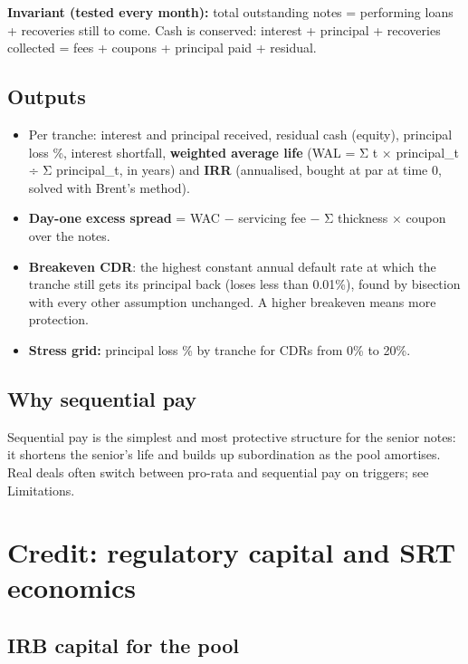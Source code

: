 \documentclass[10pt,a4paper]{article}
\providecommand{\tightlist}{\setlength{\itemsep}{1pt}\setlength{\parskip}{0pt}}
\numberwithin{equation}{section}
\begin{document}
\textbf{Invariant (tested every month):} total outstanding notes = performing loans + recoveries still to come. Cash is conserved: interest + principal + recoveries collected = fees + coupons + principal paid + residual.

\subsection{Outputs}\label{outputs}

\begin{itemize}
\tightlist
\item
  Per tranche: interest and principal received, residual cash (equity), principal loss \%, interest shortfall, \textbf{weighted average life} (WAL = Σ t × principal\_t ÷ Σ principal\_t, in years) and \textbf{IRR} (annualised, bought at par at time 0, solved with Brent's method).
\item
  \textbf{Day-one excess spread} = WAC − servicing fee − Σ thickness × coupon over the notes.
\item
  \textbf{Breakeven CDR}: the highest constant annual default rate at which the tranche still gets its principal back (loses less than 0.01\%), found by bisection with every other assumption unchanged. A higher breakeven means more protection.
\item
  \textbf{Stress grid:} principal loss \% by tranche for CDRs from 0\% to 20\%.
\end{itemize}

\subsection{Why sequential pay}\label{why-sequential-pay}

Sequential pay is the simplest and most protective structure for the senior notes: it shortens the senior's life and builds up subordination as the pool amortises. Real deals often switch between pro-rata and sequential pay on triggers; see Limitations.

\section{Credit: regulatory capital and SRT economics}\label{credit-regulatory-capital-and-srt-economics}

\subsection{IRB capital for the pool}\label{irb-capital-for-the-pool}
\end{document}
